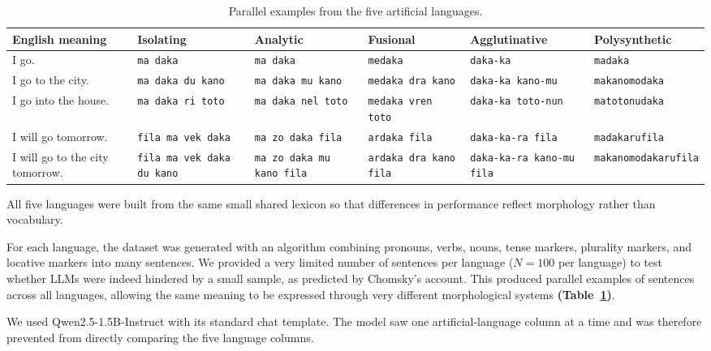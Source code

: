 \documentclass[11pt]{article}
\begin{document}
\begin{table}[t]
    \centering
    \footnotesize
    \setlength{\tabcolsep}{3pt}
    \renewcommand{\arraystretch}{1.15}
    \caption{Parallel examples from the five artificial languages.}
    \label{tab:language-examples}
    \begin{tabularx}{\textwidth}{@{}p{} X X X X X@{}}
        \toprule
        English meaning & Isolating & Analytic & Fusional & Agglutinative & Polysynthetic \\
        \midrule
        I go. & \texttt{ma daka} & \texttt{ma daka} & \texttt{medaka} & \texttt{daka-ka} & \texttt{madaka} \\
        I go to the city. & \texttt{ma daka du kano} & \texttt{ma daka mu kano} & \texttt{medaka dra kano} & \texttt{daka-ka kano-mu} & \texttt{makanomodaka} \\
        I go into the house. & \texttt{ma daka ri toto} & \texttt{ma daka nel toto} & \texttt{medaka vren toto} & \texttt{daka-ka toto-nun} & \texttt{matotonudaka} \\
        I will go tomorrow. & \texttt{fila ma vek daka} & \texttt{ma zo daka fila} & \texttt{ardaka fila} & \texttt{daka-ka-ra fila} & \texttt{madakarufila} \\
        I will go to the city tomorrow. & \texttt{fila ma vek daka du kano} & \texttt{ma zo daka mu kano fila} & \texttt{ardaka dra kano fila} & \texttt{daka-ka-ra kano-mu fila} & \texttt{makanomodakarufila} \\
        \bottomrule
    \end{tabularx}
    \end{table}

All five languages were built from the same small shared lexicon so that differences in performance reflect morphology rather than vocabulary.~

For each language, the dataset was generated with an algorithm combining pronouns, verbs, nouns, tense markers, plurality markers, and locative markers into many sentences. We provided a very limited number of sentences per language ($N=100$ per language) to test whether LLMs were indeed hindered by a small sample, as predicted by Chomsky's account. This produced parallel examples of sentences across all languages, allowing the same meaning to be expressed through very different morphological systems \textbf{(Table~\ref{tab:language-examples})}.~

We used Qwen2.5-1.5B-Instruct with its standard chat template. The model saw one artificial-language column at a time and was therefore prevented from directly comparing the five language columns.
\end{document}
